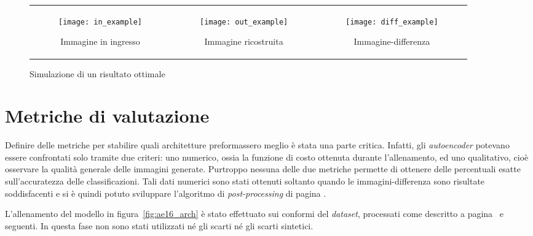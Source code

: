 \begin{figure}[ht] %
  \begin{center}
    \begin{tabular}{ccc}

      \begin{subfigure}{.3\linewidth}
        \centering\texttt{[image: in\_example]}
        \caption{Immagine in ingresso}
        \label{fig:obbiettivo_in}
      \end{subfigure} &

      \begin{subfigure}{.3\linewidth}
        \centering\texttt{[image: out\_example]}

        \caption{Immagine ricostruita}
        \label{fig:obbiettivo_out}
      \end{subfigure} &

      \begin{subfigure}{.3\linewidth}
        \centering\texttt{[image: diff\_example]}
        \caption{Immagine-differenza}
        \label{fig:obbiettivo_diff}
      \end{subfigure}

    \end{tabular}
    \caption{Simulazione di un risultato ottimale}
    \label{fig:obbiettivo_in_out_diff}
  \end{center}
\end{figure}

\section{Metriche di valutazione}
Definire delle metriche per stabilire quali architetture preformassero meglio è stata una parte critica.
Infatti, gli \textit{autoencoder} potevano essere confrontati solo tramite due criteri: uno numerico, ossia la funzione di costo ottenuta durante l'allenamento, ed uno qualitativo, cioè osservare la qualità generale delle immagini generate.
Purtroppo nessuna delle due metriche permette di ottenere delle percentuali esatte sull'accuratezza delle classificazioni.
Tali dati numerici sono stati ottenuti soltanto quando le immagini-differenza sono risultate soddisfacenti e si è quindi potuto sviluppare l'algoritmo di \textit{post-processing} di pagina \pageref{post-processing}.

L'allenamento del modello in figura~\ref{fig:ae16_arch} è stato effettuato sui conformi del \textit{dataset}, processati come descritto a pagina~\pageref{prep} e seguenti.
In questa fase non sono stati utilizzati né gli scarti né gli scarti sintetici.


